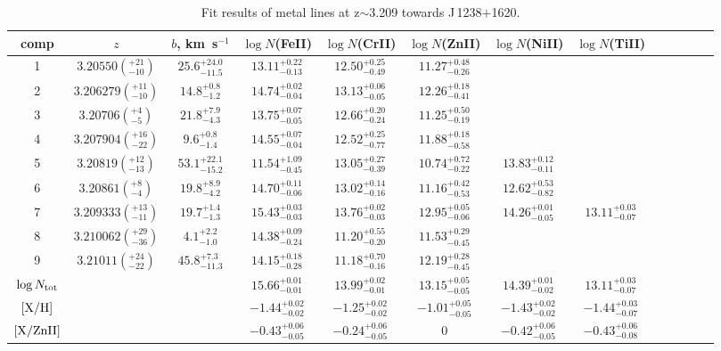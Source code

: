 \documentclass[fleqn,usenatbib,useAMS]{mnras}
\begin{document}
\begin{table*}
\caption{Fit results of metal lines at z$\sim$3.209 towards J\,1238$+$1620.}
\label{tab:fit_me_J1238}
\begin{tabular}{ccccccccccccc}
\hline %
comp & $z$ & $b$, km~s$^{-1}$ & $\log N$(FeII) & $\log N$(CrII) & $\log N$(ZnII) & $\log N$(NiII) & $\log N$(TiII) \\
\hline
1 & $3.20550(^{+21}_{-10})$ & $25.6^{+24.0}_{-11.5}$ & $13.11^{+0.22}_{-0.13}$ & $12.50^{+0.25}_{-0.49}$ & $11.27^{+0.48}_{-0.26}$ &  &  \\
2 & $3.206279(^{+11}_{-10})$ & $14.8^{+0.8}_{-1.2}$ & $14.74^{+0.02}_{-0.04}$ & $13.13^{+0.06}_{-0.05}$ & $12.26^{+0.18}_{-0.41}$ &  &  \\
3 & $3.20706(^{+4}_{-5})$ & $21.8^{+7.9}_{-4.3}$ & $13.75^{+0.07}_{-0.05}$ & $12.66^{+0.20}_{-0.24}$ & $11.25^{+0.50}_{-0.19}$ &  &  \\
4 & $3.207904(^{+16}_{-22})$ & $9.6^{+0.8}_{-1.4}$ & $14.55^{+0.07}_{-0.04}$ & $12.52^{+0.25}_{-0.77}$ & $11.88^{+0.18}_{-0.58}$ &  &  \\
5 & $3.20819(^{+12}_{-13})$ & $53.1^{+22.1}_{-15.2}$ & $11.54^{+1.09}_{-0.45}$ & $13.05^{+0.27}_{-0.39}$ & $10.74^{+0.72}_{-0.22}$ & $13.83^{+0.12}_{-0.11}$ &  \\
6 & $3.20861(^{+8}_{-4})$ & $19.8^{+8.9}_{-4.2}$ & $14.70^{+0.11}_{-0.06}$ & $13.02^{+0.14}_{-0.16}$ & $11.16^{+0.42}_{-0.53}$ & $12.62^{+0.53}_{-0.82}$ &  \\
7 & $3.209333(^{+13}_{-11})$ & $19.7^{+1.4}_{-1.3}$ & $15.43^{+0.03}_{-0.03}$ & $13.76^{+0.02}_{-0.03}$ & $12.95^{+0.05}_{-0.06}$ & $14.26^{+0.01}_{-0.05}$ & $13.11^{+0.03}_{-0.07}$ \\
8 & $3.210062(^{+29}_{-36})$ & $4.1^{+2.2}_{-1.0}$ & $14.38^{+0.09}_{-0.24}$ & $11.20^{+0.55}_{-0.20}$ & $11.53^{+0.29}_{-0.45}$ &  &  \\
9 & $3.21011(^{+24}_{-22})$ & $45.8^{+7.3}_{-11.3}$ & $14.15^{+0.18}_{-0.28}$ & $11.18^{+0.70}_{-0.16}$ & $12.19^{+0.28}_{-0.45}$ &  &  \\
$\log N_{\rm tot}$ &  &  & $15.66^{+0.01}_{-0.01}$ & $13.99^{+0.02}_{-0.01}$ & $13.15^{+0.05}_{-0.05}$ & $14.39^{+0.01}_{-0.02}$ & $13.11^{+0.03}_{-0.07}$ \\
$\rm [X/H]$ &  &  & $-1.44^{+0.02}_{-0.02}$ & $-1.25^{+0.02}_{-0.02}$ & $-1.01^{+0.05}_{-0.05}$ & $-1.43^{+0.02}_{-0.02}$ & $-1.44^{+0.03}_{-0.07}$ \\
$\rm [X/ZnII]$ &  &  & $-0.43^{+0.06}_{-0.05}$ & $-0.24^{+0.06}_{-0.05}$ & $0$ & $-0.42^{+0.06}_{-0.05}$ & $-0.43^{+0.06}_{-0.08}$ \\
\hline
\end{tabular}
\end{table*}
\end{document}
